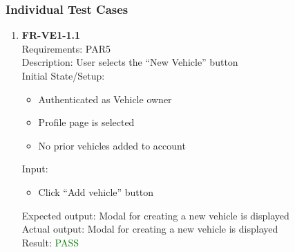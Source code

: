 \documentclass[12pt, titlepage]{article}
\newcommand{\testpass}{\textcolor{green}{PASS}}
\begin{document}
        \subsubsection{Individual Test Cases}
            \begin{enumerate}
                \item \textbf{FR-VE1-1.1} \label{FR-VE1-1.1} \\ Requirements: PAR5 \\
                    Description: User selects the ``New Vehicle'' button \\
                    Initial State/Setup: \begin{itemize}
                        \item Authenticated as Vehicle owner
                        \item Profile page is selected
                        \item No prior vehicles added to account
                    \end{itemize}
                    Input: \begin{itemize}
                        \item Click ``Add vehicle'' button
                    \end{itemize}
                    Expected output: Modal for creating a new vehicle is displayed \\
                    Actual output: Modal for creating a new vehicle is displayed \\
                    Result: \testpass
                    

\end{enumerate}
\end{document}
